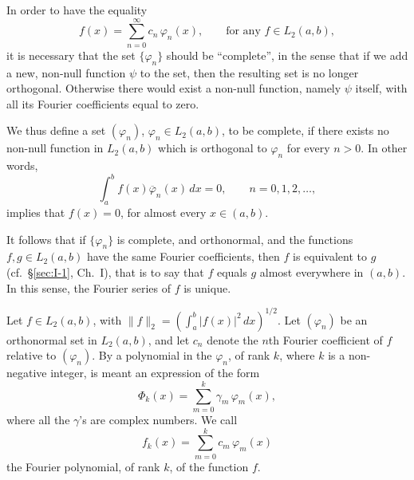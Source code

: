 In order to have the equality
\[
f(x)=\sum_{n=0}^{\infty}c_{n}\,\varphi_{n}(x),\qquad\text{for any }f\in L_{2}(a,b),
\]
it is necessary that the set $\{\varphi_{n}\}$ should be ``complete'', in the sense that if we add a new, non-null function $\psi$ to the set, then the resulting set is no longer orthogonal. Otherwise there would exist a non-null function, namely $\psi$ itself, with all its Fourier coefficients equal to zero.

We thus define a set $(\varphi_{n})$, $\varphi_{n}\in L_{2}(a,b)$, to be complete, if there exists no non-null function in $L_{2}(a,b)$ which is orthogonal to $\varphi_{n}$ for every $n>0$. In other words,
\[
\int_{a}^{b}f(x)\overline{\varphi}_{n}(x)\,dx=0,\qquad n=0,1,2,\dots,
\]
implies that $f(x)=0$, for almost every $x\in(a,b)$.

It follows that if $\{\varphi_{n}\}$ is complete, and orthonormal, and the functions $f,g\in L_{2}(a,b)$ have the same Fourier coefficients, then $f$ is equivalent to $g$ (cf.\ \S\ref{sec:I-1}, Ch.~I), that is to say that $f$ equals $g$ almost everywhere in $(a,b)$. In this sense, the Fourier series of $f$ is unique.

Let $f\in L_{2}(a,b)$, with $\|f\|_{2}=(\int_{a}^{b}|f(x)|^{2}\,dx)^{1/2}$. Let $(\varphi_{n})$ be an orthonormal set in $L_{2}(a,b)$, and let $c_{n}$ denote the $n$th Fourier coefficient of $f$ relative to $(\varphi_{n})$. By a polynomial in the $\varphi_{n}$, of rank $k$, where $k$ is a non-negative integer, is meant an expression of the form
\begin{equation}\tag{8.3}\label{eq:II-8.3}
\Phi_{k}(x)=\sum_{m=0}^{k}\gamma_{m}\,\varphi_{m}(x),
\end{equation}
where all the $\gamma$'s are complex numbers. We call
\begin{equation}\tag{8.4}\label{eq:II-8.4}
f_{k}(x)=\sum_{m=0}^{k}c_{m}\,\varphi_{m}(x)
\end{equation}
the Fourier polynomial, of rank $k$, of the function $f$.

